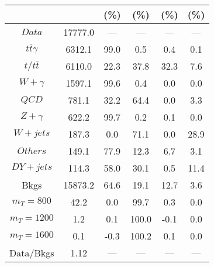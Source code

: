 \begin{figure}
\begin{minipage}[c]{0.32\textwidth}
{\begin{tabular}{cccccc}
 &  & (\%) & (\%) & (\%) & (\%)  \\
\hline
                                                                      $ Data $ &  17777.0 &  --- &  --- &  --- &  ---\\
$ t\bar{t}\gamma $ &  6312.1 &  99.0 &  0.5 &  0.4 &  0.1\\
$ t/t\bar{t} $ &  6110.0 &  22.3 &  37.8 &  32.3 &  7.6\\
$ W+\gamma $ &  1597.1 &  99.6 &  0.4 &  0.0 &  0.0\\
$ QCD $ &  781.1 &  32.2 &  64.4 &  0.0 &  3.3\\
$ Z+\gamma $ &  622.2 &  99.7 &  0.2 &  0.1 &  0.0\\
$ W+jets $ &  187.3 &  0.0 &  71.1 &  0.0 &  28.9\\
$ Others $ &  149.1 &  77.9 &  12.3 &  6.7 &  3.1\\
$ DY+jets $ &  114.3 &  58.0 &  30.1 &  0.5 &  11.4\\
Bkgs &  15873.2 &  64.6 &  19.1 &  12.7 &  3.6\\
$ m_{T} = 800 $ &  42.2 &  0.0 &  99.7 &  0.3 &  0.0\\
$ m_{T} = 1200 $ &  1.2 &  0.1 &  100.0 &  -0.1 &  0.0\\
$ m_{T} = 1600 $ &  0.1 &  -0.3 &  100.2 &  0.1 &  0.0\\
Data/Bkgs &  1.12 &  --- &  --- &  --- &  ---\\
\hline
\end{tabular}
}
\end{minipage}
\end{figure}


